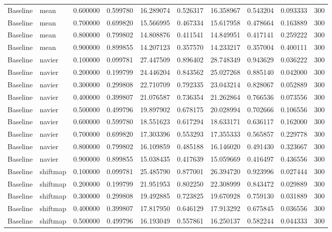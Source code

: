 \begin{table}[h]
\begin{tabular}{llrrrrrrrr}
Baseline & mean & 0.600000 & 0.599780 & 16.289074 & 0.526317 & 16.358967 & 0.543204 & 0.093333 & 300 \\
Baseline & mean & 0.700000 & 0.699820 & 15.566995 & 0.467334 & 15.617958 & 0.478664 & 0.163889 & 300 \\
Baseline & mean & 0.800000 & 0.799802 & 14.808876 & 0.411541 & 14.849951 & 0.417141 & 0.259222 & 300 \\
Baseline & mean & 0.900000 & 0.899855 & 14.207123 & 0.357570 & 14.233217 & 0.357004 & 0.400111 & 300 \\
Baseline & navier & 0.100000 & 0.099781 & 27.447509 & 0.896402 & 28.748349 & 0.943629 & 0.036222 & 300 \\
Baseline & navier & 0.200000 & 0.199799 & 24.446204 & 0.843562 & 25.027268 & 0.885140 & 0.042000 & 300 \\
Baseline & navier & 0.300000 & 0.299808 & 22.710709 & 0.792335 & 23.043214 & 0.828067 & 0.052889 & 300 \\
Baseline & navier & 0.400000 & 0.399807 & 21.076587 & 0.736354 & 21.262864 & 0.766536 & 0.073556 & 300 \\
Baseline & navier & 0.500000 & 0.499796 & 19.897902 & 0.678175 & 20.028994 & 0.702666 & 0.106556 & 300 \\
Baseline & navier & 0.600000 & 0.599780 & 18.551623 & 0.617294 & 18.633171 & 0.636117 & 0.162000 & 300 \\
Baseline & navier & 0.700000 & 0.699820 & 17.303396 & 0.553293 & 17.355333 & 0.565857 & 0.229778 & 300 \\
Baseline & navier & 0.800000 & 0.799802 & 16.109859 & 0.485188 & 16.146020 & 0.491430 & 0.323667 & 300 \\
Baseline & navier & 0.900000 & 0.899855 & 15.038435 & 0.417639 & 15.059669 & 0.416497 & 0.436556 & 300 \\
Baseline & shiftmap & 0.100000 & 0.099781 & 25.485790 & 0.877001 & 26.394720 & 0.923996 & 0.027444 & 300 \\
Baseline & shiftmap & 0.200000 & 0.199799 & 21.951953 & 0.802250 & 22.308999 & 0.843472 & 0.029889 & 300 \\
Baseline & shiftmap & 0.300000 & 0.299808 & 19.492885 & 0.723825 & 19.670928 & 0.759130 & 0.031889 & 300 \\
Baseline & shiftmap & 0.400000 & 0.399807 & 17.817950 & 0.646129 & 17.913292 & 0.675845 & 0.036556 & 300 \\
Baseline & shiftmap & 0.500000 & 0.499796 & 16.193049 & 0.557861 & 16.250137 & 0.582244 & 0.044333 & 300 \\

\end{tabular}
\end{table}
